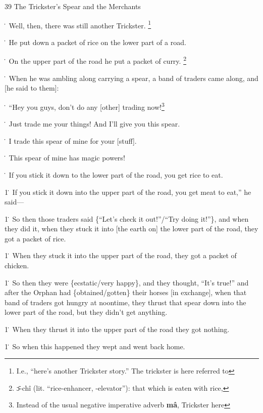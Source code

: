 
39 The Trickster's Spear and the Merchants

\. Well, then, there was still another Trickster. \footnote{I.e., ``here's another Trickster story.'' The trickster is here referred to}

\. He put down a packet of rice on the lower part of a road.

\. On the upper part of the road he put a packet of curry. \footnote{ɔ̄-chî (lit. ``rice-enhancer, -elevator''): that which is eaten with rice,}

\. When he was ambling along carrying a spear, a band of traders came along, and
[he said to them]:

\. ``Hey you guys, don't do any [other] trading now!\footnote{Instead of the usual negative imperative adverb \textbf{mâ}, Trickster here}

\. Just trade me your things! And I'll give you this spear.

\. I trade this spear of mine for your [stuff].

\. This spear of mine has magic powers!

\. If you stick it down to the lower part of the road, you get rice to eat.

1\. If you stick it down into the upper part of the road, you get meat to eat,''
he said---

1\. So then those traders said \{``Let's check it out!''/``Try doing it!''\}, and
when they did it, when they stuck it into [the earth on] the lower part of the
road, they got a packet of rice.

1\. When they stuck it into the upper part of the road, they got a packet of chicken.

1\. So then they were \{ecstatic/very happy\}, and they thought, ``It's true!''
and after the Orphan had \{obtained/gotten\} their horses [in exchange], when that
band of traders got hungry at noontime, they thrust that spear down into the lower
part of the road, but they didn't get anything.

1\. When they thrust it into the upper part of the road they got nothing.

1\. So when this happened they wept and went back home.

